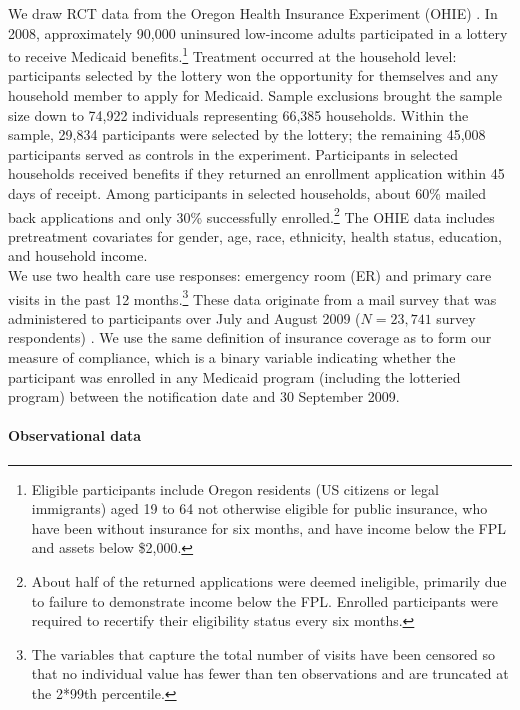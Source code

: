 \documentclass[12pt]{article}
\begin{document}
We draw RCT data from the Oregon Health Insurance Experiment (OHIE) \citep{finkelstein2012,baicker2013,baicker2014,Taubman}.  In 2008, approximately 90,000 uninsured low-income adults participated in a lottery to receive Medicaid benefits.\footnote{Eligible participants include Oregon residents (US citizens or legal immigrants) aged 19 to 64 not otherwise eligible for public insurance, who have been without insurance for six months, and have income below the FPL and assets below \$2,000.} Treatment occurred at the household level: participants selected by the lottery won the opportunity for themselves and any household member to apply for Medicaid. Sample exclusions brought the sample size down to 74,922 individuals representing 66,385 households.  Within the sample, 29,834 participants were selected by the lottery; the remaining 45,008 participants served as controls in the experiment.  Participants in selected households received benefits if they returned an enrollment application within 45 days of receipt. Among participants in selected households, about 60\% mailed back applications and only 30\% successfully enrolled.\footnote{About half of the returned applications were deemed ineligible, primarily due to failure to demonstrate income below the FPL. Enrolled participants were required to recertify their eligibility status every six months.} The OHIE data includes pretreatment covariates for gender, age, race, ethnicity, health status, education, and household income. \\

We use two health care use responses: emergency room (ER) and primary care visits in the past 12 months.\footnote{The variables that capture the total number of visits have been censored so that no individual value has fewer than ten observations and are truncated at the 2*99th percentile.} These data originate from a mail survey that was administered to participants over July and August 2009 ($N = 23,741$ survey respondents) \cite{finkelstein2012}. We use the same definition of insurance coverage as \citet{finkelstein2012} to form our measure of compliance, which is a binary variable indicating whether the participant was enrolled in any Medicaid program (including the lotteried program) between the notification date and 30 September 2009. 

\paragraph{Observational data} 
\end{document}
